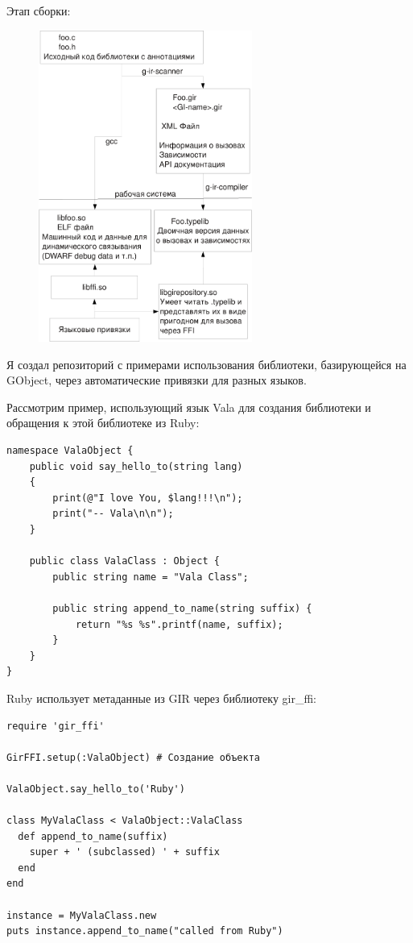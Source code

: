 \documentclass[10pt, a5paper]{article}
\begin{document}
  Этап сборки:
  
 \begin{figure}[ht]
  \centering
  \includegraphics[width=7cm]{103_2012_antono-crop}
  \label{fig:Antono1}
\end{figure}


Я создал репозиторий \cite{Antono2} с примерами использования библиотеки,
базирующейся на GObject, через автоматические привязки для разных языков.

Рассмотрим пример, использующий язык Vala для создания библиотеки и
обращения к этой библиотеке из Ruby:

\begin{verbatim}
namespace ValaObject {
	public void say_hello_to(string lang)
	{
		print(@"I love You, $lang!!!\n");
		print("-- Vala\n\n");
	}

	public class ValaClass : Object {
		public string name = "Vala Class";

		public string append_to_name(string suffix) {
			return "%s %s".printf(name, suffix);
		}
	}
}
\end{verbatim}

Ruby использует метаданные из GIR через библиотеку gir\_ffi:

\begin{verbatim}
require 'gir_ffi'

GirFFI.setup(:ValaObject) # Создание объекта

ValaObject.say_hello_to('Ruby')

class MyValaClass < ValaObject::ValaClass
  def append_to_name(suffix)
    super + ' (subclassed) ' + suffix
  end
end

instance = MyValaClass.new
puts instance.append_to_name("called from Ruby")
\end{verbatim}
\end{document}
